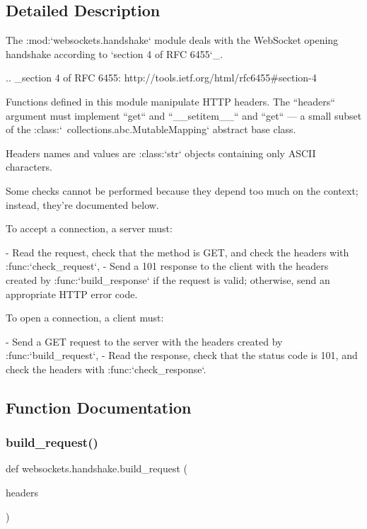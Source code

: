 \subsection{Detailed Description}
\begin{DoxyVerb}The :mod:`websockets.handshake` module deals with the WebSocket opening
handshake according to `section 4 of RFC 6455`_.

.. _section 4 of RFC 6455: http://tools.ietf.org/html/rfc6455#section-4

Functions defined in this module manipulate HTTP headers. The ``headers``
argument must implement ``get`` and ``__setitem__`` and ``get`` —  a small
subset of the :class:`~collections.abc.MutableMapping` abstract base class.

Headers names and values are :class:`str` objects containing only ASCII
characters.

Some checks cannot be performed because they depend too much on the
context; instead, they're documented below.

To accept a connection, a server must:

- Read the request, check that the method is GET, and check the headers with
  :func:`check_request`,
- Send a 101 response to the client with the headers created by
  :func:`build_response` if the request is valid; otherwise, send an
  appropriate HTTP error code.

To open a connection, a client must:

- Send a GET request to the server with the headers created by
  :func:`build_request`,
- Read the response, check that the status code is 101, and check the headers
  with :func:`check_response`.\end{DoxyVerb}
 

\subsection{Function Documentation}
\mbox{\label{namespacewebsockets_1_1handshake_a5fe8d524dcf44ac708fd508eae3ff81c}} 
\subsubsection{\texorpdfstring{build\+\_\+request()}{build\_request()}}
{\footnotesize\ttfamily def websockets.\+handshake.\+build\+\_\+request (\begin{DoxyParamCaption}\item[{}]{headers }\end{DoxyParamCaption})}

